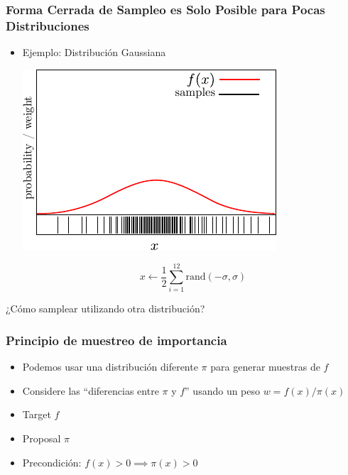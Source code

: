 \begin{frame}
    \frametitle{Forma Cerrada de Sampleo es Solo Posible para Pocas Distribuciones }
    \begin{itemize}
        \item Ejemplo: Distribución Gaussiana
        
        \begin{center}
            \includegraphics[width=0.5\columnwidth]{./images/particle_filter/gaussian_approximation_by_sampling.pdf}
        \end{center}
        
        \begin{equation*}
            x \leftarrow \frac{1}{2} \sum_{i=1}^{12} \text{rand}(-\sigma, \sigma)
        \end{equation*}
    \end{itemize}

    ¿Cómo samplear utilizando otra distribución?



\end{frame}
    


\begin{frame}
    \frametitle{Principio de muestreo de importancia}
    \begin{itemize}
        \item Podemos usar una distribución diferente $\pi$ para generar muestras de $f$
        \item Considere las ``diferencias entre $\pi$ y $f$'' usando un peso $w = f(x) / \pi(x)$
        \item Target $f$
        \item Proposal $\pi$
        \item Precondición:
        $f(x) > 0 \implies \pi(x) > 0$
        \begin{center}
        \end{center}
    \end{itemize}
\end{frame}
    

